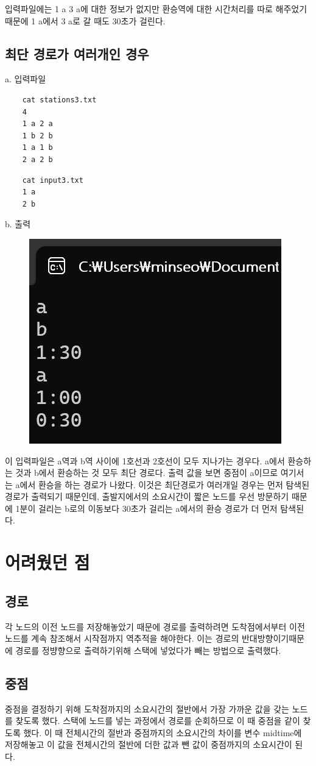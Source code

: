 \documentclass{oblivoir}
\begin{document}
입력파일에는 1 a 3 a에 대한 정보가 없지만 환승역에 대한 시간처리를 따로 해주었기 때문에 1 a에서 3 a로 갈 때도 30초가 걸린다.

\subsection{최단 경로가 여러개인 경우}
a. 입력파일
\begin{verbatim}
    cat stations3.txt
    4
    1 a 2 a
    1 b 2 b
    1 a 1 b
    2 a 2 b
\end{verbatim}
\begin{verbatim}
    cat input3.txt
    1 a
    2 b
\end{verbatim}
b. 출력
\begin{figure}[h]
    \includegraphics[width=0.3\linewidth]{result3.png}
\end{figure}

이 입력파일은 a역과 b역 사이에 1호선과 2호선이 모두 지나가는 경우다. a에서 환승하는 것과 b에서 환승하는 것 모두 최단 경로다. 출력 값을 보면 중점이 a이므로 여기서는 a에서 환승을 하는 경로가 나왔다. 이것은 최단경로가 여러개일 경우는 먼저 탐색된 경로가 출력되기 때문인데, 출발지에서의 소요시간이 짧은 노드를 우선 방문하기 때문에 1분이 걸리는 b로의 이동보다 30초가 걸리는 a에서의 환승 경로가 더 먼저 탐색된다.

\section{어려웠던 점}

\subsection{경로}
각 노드의 이전 노드를 저장해놓았기 때문에 경로를 출력하려면 도착점에서부터 이전노드를 계속 참조해서 시작점까지 역추적을 해야한다. 이는 경로의 반대방향이기때문에 경로를 정뱡향으로 출력하기위해 스택에 넣었다가 빼는 방법으로 출력했다.

\subsection{중점}
중점을 결정하기 위해 도착점까지의 소요시간의 절반에서 가장 가까운 값을 갖는 노드를 찾도록 했다.
스택에 노드를 넣는 과정에서 경로를 순회하므로 이 때 중점을 같이 찾도록 했다. 이 때 전체시간의 절반과 중점까지의 소요시간의 차이를 변수 midtime에 저장해놓고 이 값을 전체시간의 절반에 더한 값과 뺀 값이 중점까지의 소요시간이 된다.
\end{document}
